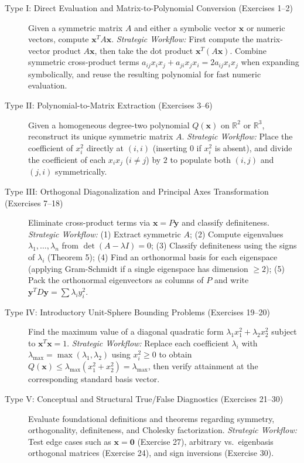 \documentclass[11pt, letterpaper]{article}
\theoremstyle{definition}
\theoremstyle{remark}
\begin{document}
\begin{description}
    \item[Type I: Direct Evaluation and Matrix-to-Polynomial Conversion (Exercises 1--2)]
    Given a symmetric matrix $A$ and either a symbolic vector $\mathbf{x}$ or numeric vectors, compute $\mathbf{x}^T A \mathbf{x}$. \emph{Strategic Workflow:} First compute the matrix-vector product $A\mathbf{x}$, then take the dot product $\mathbf{x}^T (A\mathbf{x})$. Combine symmetric cross-product terms $a_{ij} x_i x_j + a_{ji} x_j x_i = 2a_{ij} x_i x_j$ when expanding symbolically, and reuse the resulting polynomial for fast numeric evaluation.

    \item[Type II: Polynomial-to-Matrix Extraction (Exercises 3--6)]
    Given a homogeneous degree-two polynomial $Q(\mathbf{x})$ on $\mathbb{R}^2$ or $\mathbb{R}^3$, reconstruct its unique symmetric matrix $A$. \emph{Strategic Workflow:} Place the coefficient of $x_i^2$ directly at $(i,i)$ (inserting $0$ if $x_i^2$ is absent), and divide the coefficient of each $x_i x_j$ ($i \ne j$) by $2$ to populate both $(i,j)$ and $(j,i)$ symmetrically.

    \item[Type III: Orthogonal Diagonalization and Principal Axes Transformation (Exercises 7--18)]
    Eliminate cross-product terms via $\mathbf{x} = P\mathbf{y}$ and classify definiteness. \emph{Strategic Workflow:} (1) Extract symmetric $A$; (2) Compute eigenvalues $\lambda_1, \dots, \lambda_n$ from $\det(A - \lambda I) = 0$; (3) Classify definiteness using the signs of $\lambda_i$ (Theorem 5); (4) Find an orthonormal basis for each eigenspace (applying Gram-Schmidt if a single eigenspace has dimension $\ge 2$); (5) Pack the orthonormal eigenvectors as columns of $P$ and write $\mathbf{y}^T D \mathbf{y} = \sum \lambda_i y_i^2$.

    \item[Type IV: Introductory Unit-Sphere Bounding Problems (Exercises 19--20)]
    Find the maximum value of a diagonal quadratic form $\lambda_1 x_1^2 + \lambda_2 x_2^2$ subject to $\mathbf{x}^T \mathbf{x} = 1$. \emph{Strategic Workflow:} Replace each coefficient $\lambda_i$ with $\lambda_{\max} = \max(\lambda_1, \lambda_2)$ using $x_i^2 \ge 0$ to obtain $Q(\mathbf{x}) \le \lambda_{\max}(x_1^2 + x_2^2) = \lambda_{\max}$, then verify attainment at the corresponding standard basis vector.

    \item[Type V: Conceptual and Structural True/False Diagnostics (Exercises 21--30)]
    Evaluate foundational definitions and theorems regarding symmetry, orthogonality, definiteness, and Cholesky factorization. \emph{Strategic Workflow:} Test edge cases such as $\mathbf{x} = \mathbf{0}$ (Exercise 27), arbitrary vs.\ eigenbasis orthogonal matrices (Exercise 24), and sign inversions (Exercise 30).


\end{description}
\end{document}
